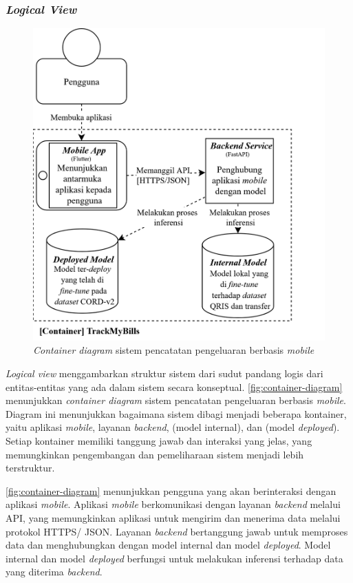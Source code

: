 \subsubsection{\emph{Logical View}}
\label{subsubsec:logical-view}

\begin{figure}[htbp]
    \centering
    \includegraphics[width=.8\textwidth]{images/container-diagram.png}
    \caption{\emph{Container diagram} sistem pencatatan pengeluaran berbasis \emph{mobile}}
    \label{fig:container-diagram}
\end{figure}

\emph{Logical view} menggambarkan struktur sistem dari sudut pandang logis dari entitas-entitas yang ada dalam sistem secara konseptual. \autoref{fig:container-diagram} menunjukkan \emph{container diagram} sistem pencatatan pengeluaran berbasis \emph{mobile}. Diagram ini menunjukkan bagaimana sistem dibagi menjadi beberapa kontainer, yaitu aplikasi \emph{mobile}, layanan \emph{backend}, \donutqristf{} (model internal), dan \donutcord{} (model \emph{deployed}). Setiap kontainer memiliki tanggung jawab dan interaksi yang jelas, yang memungkinkan pengembangan dan pemeliharaan sistem menjadi lebih terstruktur.

\autoref{fig:container-diagram} menunjukkan pengguna yang akan berinteraksi dengan aplikasi \emph{mobile}. Aplikasi \emph{mobile} berkomunikasi dengan layanan \emph{backend} melalui API, yang memungkinkan aplikasi untuk mengirim dan menerima data melalui protokol HTTPS/ JSON. Layanan \emph{backend} bertanggung jawab untuk memproses data dan menghubungkan dengan model internal dan model \emph{deployed}. Model internal dan model \emph{deployed} berfungsi untuk melakukan inferensi terhadap data yang diterima \emph{backend}.


